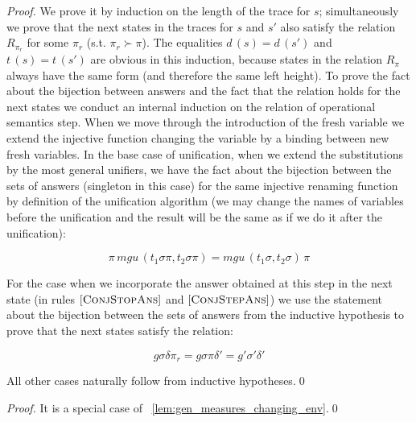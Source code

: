 \begin{proof}
We prove it by induction on the length of the trace for $s$; simultaneously we prove that the next states in the traces for $s$ and $s'$ also satisfy the relation $R_{\pi_r}$ for some $\pi_r$ (s.t. $\pi_r \succ \pi$). The equalities $d\,(s) = d\,(s')$ and $t\,(s) = t\,(s')$ are obvious in this induction, because states in the relation $R_{\pi}$ always have the same form (and therefore the same left height). To prove the fact about the bijection between answers and the fact that the relation holds for the next states we conduct an internal induction on the relation of operational semantics step. When we move through the introduction of the fresh variable we extend the injective function changing the variable by a binding between new fresh variables. In the base case of unification, when we extend the substitutions by the most general unifiers, we have the fact about the bijection between the sets of answers (singleton in this case) for the same injective renaming function by definition of the unification algorithm (we may change the names of variables before the unification and the result will be the same as if we do it after the unification):

\[ \pi \, mgu\,(t_1 \sigma \pi, t_2 \sigma \pi) = mgu\,(t_1 \sigma, t_2 \sigma) \, \pi  \]

For the case when we incorporate the answer obtained at this step in the next state (in rules $\mbox{[\textsc{ConjStopAns}]}$ and $\mbox{[\textsc{ConjStepAns}]}$) we use the statement about the bijection between the sets of answers from the inductive hypothesis to prove that the next states satisfy the relation:

\[ g \sigma \delta \pi_r = g \sigma \pi \delta' = g' \sigma' \delta'  \] 

All other cases naturally follow from inductive hypotheses.\qed

\end{proof}

\begin{proof}
It is a special case of \lemmaword~\ref{lem:gen_measures_changing_env}.\qed
\end{proof}

